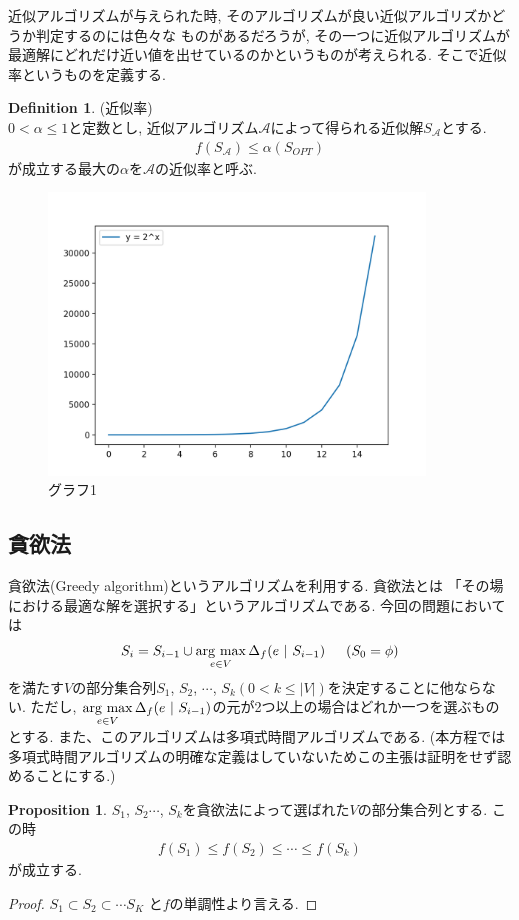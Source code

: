 \documentclass[11pt, a4paper, dvipdfmx]{jsarticle}
\theoremstyle{definition}
\newtheorem{Definition+}[Axiom+]{Definition}
\newtheorem{Proposition+}[Axiom+]{Proposition}
\begin{document}
近似アルゴリズムが与えられた時, そのアルゴリズムが良い近似アルゴリズかどうか判定するのには色々な
ものがあるだろうが, その一つに近似アルゴリズムが最適解にどれだけ近い値を出せているのかというものが考えられる. そこで近似率というものを定義する.
\begin{Definition+}(近似率)\\
    $ 0< \alpha \leq 1$と定数とし, 近似アルゴリズム$\mathcal{A}$によって得られる近似解$S_{\mathcal{A}}$とする. 
    \begin{align*}
        f(S_{\mathcal{A}})\leq \alpha(S_{OPT})
    \end{align*}
    が成立する最大の$\alpha$を$\mathcal{A}$の近似率と呼ぶ.
\end{Definition+}
\begin{figure}[h]
    \centering
    \includegraphics[width = 100mm]{Graph1_houtei.png}
    \caption{グラフ1}
\end{figure}
\subsection{貪欲法}
 貪欲法(Greedy algorithm)というアルゴリズムを利用する. 貪欲法とは
「その場における最適な解を選択する」というアルゴリズムである. 今回の問題においては
\begin{align*}
    S_{i} = S_{i - 1}\cup\mathop{\rm arg~max}\limits_{e\in V}\Delta_{f}(e~|~S_{i - 1})\hspace{15pt}(S_{0} = \phi)
\end{align*}
を満たす$V$の部分集合列$S_{1}$, $S_{2}$, $\cdots$, $S_{k}(0<k\leq |V|)$を決定することに他ならない. ただし, $\mathop{\rm arg~max}\limits_{e\in V}\Delta_{f}(e~|~S_{i - 1})$の元が2つ以上の場合はどれか一つを選ぶものとする. 
また、このアルゴリズムは多項式時間アルゴリズムである. (本方程では多項式時間アルゴリズムの明確な定義はしていないためこの主張は証明をせず認めることにする.) 
\begin{Proposition+}
$S_{1}$, $S_{2}$$\cdots$, $S_{k}$を貪欲法によって選ばれた$V$の部分集合列とする. この時
    \begin{align*}
        f(S_{1})\leq f(S_{2})\leq \cdots \leq f(S_{k})
    \end{align*}
    が成立する.
    \begin{proof}
        $S_{1}\subset S_{2}\subset \cdots S_{K}$ と$f$の単調性より言える.
    \end{proof}
\end{Proposition+}
\end{document}
